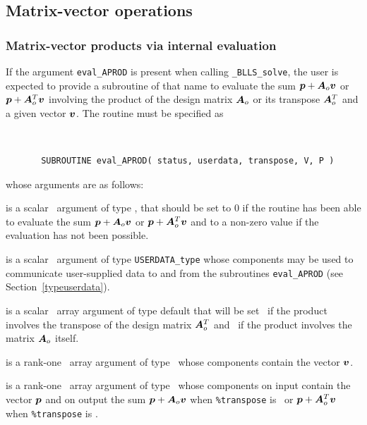 \documentclass{galahad}
\newcommand{\packagename}{BLLS}
\newcommand{\fullpackagename}{\libraryname\_\packagename}
\newcommand{\solver}{{\tt \fullpackagename\_solve}}
\begin{document}

\subsection{Matrix-vector operations\label{fdv}}


\subsubsection{Matrix-vector products via internal evaluation\label{jvp}}

If the argument {\tt eval\_APROD} is present when calling \solver, the
user is expected to provide a subroutine of that name to evaluate the
sum ${\bm{p}} + {\bm{A}}_o {\bm{v}}$ or ${\bm{p}} + {\bm{A}}_o^T{\bm{v}}$ involving the
product of the design matrix ${\bm{A}}_o$ or its transpose ${\bm{A}}_o^T$
and a given vector ${\bm{v}}$.
The routine must be specified as

\def\baselinestretch{0.8}
{\tt
\begin{verbatim}
       SUBROUTINE eval_APROD( status, userdata, transpose, V, P )
\end{verbatim} }
\def\baselinestretch{1.0}
\noindent whose arguments are as follows:

\begin{description}
 is a scalar \intentout\ argument of type \integer,
that should be set to 0 if the routine has been able to evaluate the
sum ${\bm{p}} + {\bm{A}}_o {\bm{v}}$ or ${\bm{p}} + {\bm{A}}_o^T{\bm{v}}$
and to a non-zero value if the evaluation has not been possible.

 is a scalar \intentinout\ argument of type
{\tt USERDATA\_type} whose components may be used
to communicate user-supplied data to and from the subroutines
{\tt eval\_APROD}
(see Section~\ref{typeuserdata}).

 is a scalar \intentin\ array argument of type
default that will be set \true\ if the product involves the transpose
of the design matrix ${\bm{A}}_o^T$ and \false\ if the product involves
the matrix ${\bm{A}}_o$ itself.

 is a rank-one \intentin\ array argument of type \realdp\
whose components contain the vector ${\bm{v}}$.

 is a rank-one \intentinout\ array argument of type \realdp\
whose components on input contain the vector ${\bm{p}}$ and on output the
sum ${\bm{p}} + {\bm{A}}_o {\bm{v}}$ when {\tt \%transpose} is \false\ or
${\bm{p}} + {\bm{A}}_o^T {\bm{v}}$ when {\tt \%transpose} is \true.

\end{description}
\end{document}
